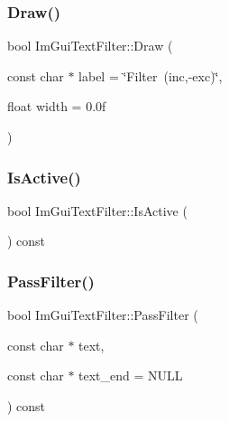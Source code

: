 \hypertarget{struct_im_gui_text_filter_ab93ad5985019ff9d3781606551fc26cc}{}\label{struct_im_gui_text_filter_ab93ad5985019ff9d3781606551fc26cc} 
\subsubsection{\texorpdfstring{Draw()}{Draw()}}
{\footnotesize\ttfamily bool Im\+Gui\+Text\+Filter\+::\+Draw (\begin{DoxyParamCaption}\item[{const char $\ast$}]{label = {\ttfamily \char`\"{}Filter~(inc,-\/exc)\char`\"{}},  }\item[{float}]{width = {\ttfamily 0.0f} }\end{DoxyParamCaption})}

\hypertarget{struct_im_gui_text_filter_a493158f2ab8f45fcf303c3f953be9b88}{}\label{struct_im_gui_text_filter_a493158f2ab8f45fcf303c3f953be9b88} 
\subsubsection{\texorpdfstring{Is\+Active()}{IsActive()}}
{\footnotesize\ttfamily bool Im\+Gui\+Text\+Filter\+::\+Is\+Active (\begin{DoxyParamCaption}{ }\end{DoxyParamCaption}) const}

\hypertarget{struct_im_gui_text_filter_a88d73ff8b81fbbd0a129b1bf3498d8aa}{}\label{struct_im_gui_text_filter_a88d73ff8b81fbbd0a129b1bf3498d8aa} 
\subsubsection{\texorpdfstring{Pass\+Filter()}{PassFilter()}}
{\footnotesize\ttfamily bool Im\+Gui\+Text\+Filter\+::\+Pass\+Filter (\begin{DoxyParamCaption}\item[{const char $\ast$}]{text,  }\item[{const char $\ast$}]{text\+\_\+end = {\ttfamily NULL} }\end{DoxyParamCaption}) const}




